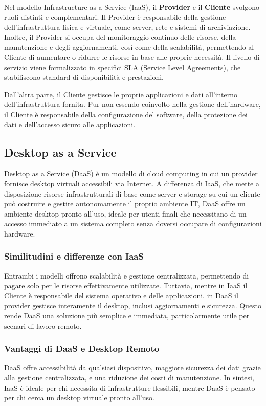 \documentclass[12pt,a4paper,openright,twoside]{book}
\begin{document}
Nel modello Infrastructure as a Service (IaaS), il \textbf{Provider} e il \textbf{Cliente} svolgono ruoli distinti e complementari. Il Provider è responsabile della gestione dell'infrastruttura fisica e virtuale, come server, rete e sistemi di archiviazione. Inoltre, il Provider si occupa del monitoraggio continuo delle risorse, della manutenzione e degli aggiornamenti, così come della scalabilità, permettendo al Cliente di aumentare o ridurre le risorse in base alle proprie necessità. Il livello di servizio viene formalizzato in specifici SLA (Service Level Agreements), che stabiliscono standard di disponibilità e prestazioni.

Dall'altra parte, il Cliente gestisce le proprie applicazioni e dati all'interno dell'infrastruttura fornita. Pur non essendo coinvolto nella gestione dell'hardware, il Cliente è responsabile della configurazione del software, della protezione dei dati e dell'accesso sicuro alle applicazioni.

\subsection{Desktop as a Service}
\label{subsec:daas}
Desktop as a Service (DaaS) è un modello di cloud computing in cui un provider fornisce desktop virtuali accessibili via Internet. A differenza di IaaS, che mette a disposizione risorse infrastrutturali di base come server e storage su cui un cliente può costruire e gestire autonomamente il proprio ambiente IT, DaaS offre un ambiente desktop pronto all'uso, ideale per utenti finali che necessitano di un accesso immediato a un sistema completo senza doversi occupare di configurazioni hardware.

\subsubsection{Similitudini e differenze con IaaS}
Entrambi i modelli offrono scalabilità e gestione centralizzata, permettendo di pagare solo per le risorse effettivamente utilizzate. Tuttavia, mentre in IaaS il Cliente è responsabile del sistema operativo e delle applicazioni, in DaaS il provider gestisce interamente il desktop, inclusi aggiornamenti e sicurezza. Questo rende DaaS una soluzione più semplice e immediata, particolarmente utile per scenari di lavoro remoto.

\subsubsection{Vantaggi di DaaS e Desktop Remoto}
DaaS offre accessibilità da qualsiasi dispositivo, maggiore sicurezza dei dati grazie alla gestione centralizzata, e una riduzione dei costi di manutenzione. In sintesi, IaaS è ideale per chi necessita di infrastrutture flessibili, mentre DaaS è pensato per chi cerca un desktop virtuale pronto all'uso.
\end{document}
